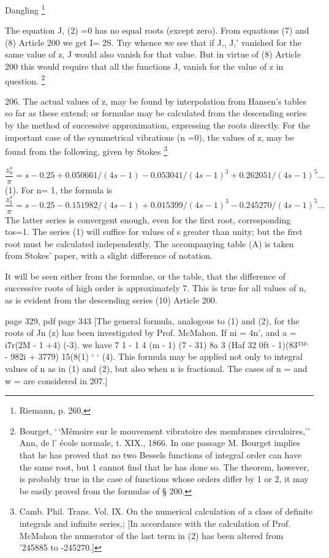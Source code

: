Dangling
\footnote{ Riemann, p. 260,}


The equation J, (2) =0 has no equal roots (except zero). From equations
(7) and (8) Article 200 we get
I= 2S. Tuy
whence we see that if J,, J,' vanished for the same value of z, J would
also vanish for that value. But in virtue of (8) Article 200 this would
require that all the functions J, vanish for the value
of z in question.
\footnote{Bourget, `\,`Mémoire sur le mouvement vibratoire des membranes
circulaires,'' Ann, de l' école normale, t. XIX., 1866.
In one passage M. Bourget implies that he
has proved that no two Bessels functions of integral order can have the same root,
but 1 cannot find that he has done so. The theorem, however, is probably true
in the case of functions whose orders differ by 1 or 2, it may be easily
proved from the formulas of § 200.}

206. The actual values of z, may be found by interpolation from Hansen's
tables so far as these extend; or formulae may be calculated from the
descending series by the method of successive approximation, expressing
the roots directly. For the important case of the symmetrical vibrations
(n =0), the values of z, may be found from the following, given by Stokes
\footnote{Camb. Phil. Trans. Vol. IX. On the numerical calculation of a class
of definite integrals and infinite series,;
[In accordance with the calculation of Prof. McMahon
the numerator of the last term in (2) has been altered from '245885
to -245270.]}

\[ \frac{z_o^{s}}{\pi} =  s - 0.25 + 0.050661/(4s-1)
-0.053041/(4s-1)^3 +  0.262051/(4s-1)^5  \ldots \]
(1).  For n= 1, the formula is
\[ \frac{z_1^{s}}{\pi} =  s - 0.25 - 0.151982/(4s-1)
+ 0.015399/(4s-1)^3 -  0.245270/(4s-1)^5  \ldots \]
The latter series is convergent enough, even for the first root,
corresponding tos=1. The series (1) will suffice for values of s greater
than unity; but the first root must be calculated independently. The
accompanying table (A) is taken from Stokes' paper, with a slight
difference of notation.

It will be seen either from the formulae, or the table, that the
difference of successive roots of high order is approximately 7. This is
true for all values of n, as is evident from the descending series (10)
Article 200.

page 329, pdf page 343
[The general formula, analogous to (1) and (2), for the roots of
Jn (z) has been investigated by Prof. McMahon. If ni = 4n', and
a = i7r(2M - 1 +4)
(-3).
we have
7 1 - 1 4 (m - 1) (7 - 31)
 8a 3 (Haf
32 0ft - 1)(83™‘ - 982i + 3779)
15(8(1) ‘ ‘
(4).
This formula may be applied not only to integral values of n as in
(1) and (2), but also when n is fractional. The cases of n = and
w = are considered in 207.]

